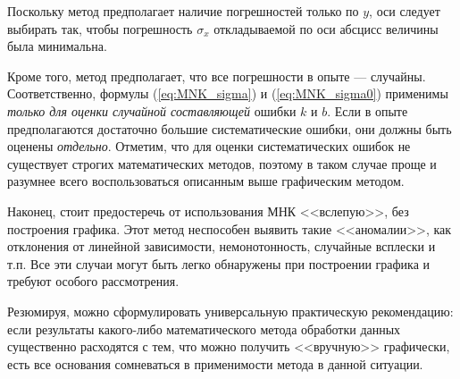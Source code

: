 Поскольку метод предполагает наличие погрешностей только по $y$,
оси следует выбирать так, чтобы погрешность $\sigma_{x}$ откладываемой
по оси абсцисс величины была минимальна.

Кроме того, метод предполагает, что все погрешности в опыте ---
случайны. Соответственно, формулы (\ref{eq:MNK_sigma}) и (\ref{eq:MNK_sigma0})
применимы \emph{только для оценки случайной составляющей} ошибки $k$
и $b$. Если в опыте предполагаются достаточно большие систематические
ошибки, они должны быть оценены \emph{отдельно}. Отметим, что для
оценки систематических ошибок не существует строгих математических
методов, поэтому в таком случае проще и разумнее всего воспользоваться
описанным выше графическим методом.

Наконец, стоит предостеречь от использования МНК <<вслепую>>,
без построения графика. Этот метод неспособен выявить такие <<аномалии>>,
как отклонения от линейной зависимости, немонотонность, случайные
всплески и т.п. Все эти случаи могут быть легко обнаружены при построении
графика и требуют особого рассмотрения.

Резюмируя, можно сформулировать универсальную практическую рекомендацию:
если результаты какого-либо математического метода обработки данных
существенно расходятся с тем, что можно получить <<вручную>>
графически, есть все основания сомневаться в применимости метода в
данной ситуации.
